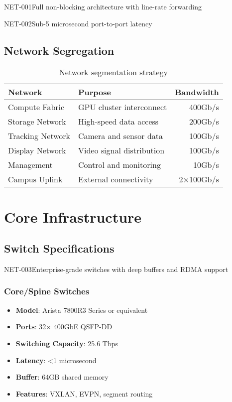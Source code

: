 \begin{requirement}{NET-001}{Full non-blocking architecture with line-rate forwarding}

\begin{requirement}{NET-002}{Sub-5 microsecond port-to-port latency}

\subsection{Network Segregation}

\begin{table}[H]
\centering
\begin{tabularx}{\textwidth}{@{}lXr@{}}
\toprule
\textbf{Network} & \textbf{Purpose} & \textbf{Bandwidth} \\
\midrule
Compute Fabric & GPU cluster interconnect & 400Gb/s \\
Storage Network & High-speed data access & 200Gb/s \\
Tracking Network & Camera and sensor data & 100Gb/s \\
Display Network & Video signal distribution & 100Gb/s \\
Management & Control and monitoring & 10Gb/s \\
Campus Uplink & External connectivity & 2×100Gb/s \\
\bottomrule
\end{tabularx}
\caption{Network segmentation strategy}
\end{table}

\section{Core Infrastructure}

\subsection{Switch Specifications}

\begin{requirement}{NET-003}{Enterprise-grade switches with deep buffers and RDMA support}

\subsubsection{Core/Spine Switches}
\begin{itemize}
    \item \textbf{Model}: Arista 7800R3 Series or equivalent
    \item \textbf{Ports}: 32× 400GbE QSFP-DD
    \item \textbf{Switching Capacity}: 25.6 Tbps
    \item \textbf{Latency}: <1 microsecond
    \item \textbf{Buffer}: 64GB shared memory
    \item \textbf{Features}: VXLAN, EVPN, segment routing
\end{itemize}


\end{requirement}
\end{requirement}
\end{requirement}

